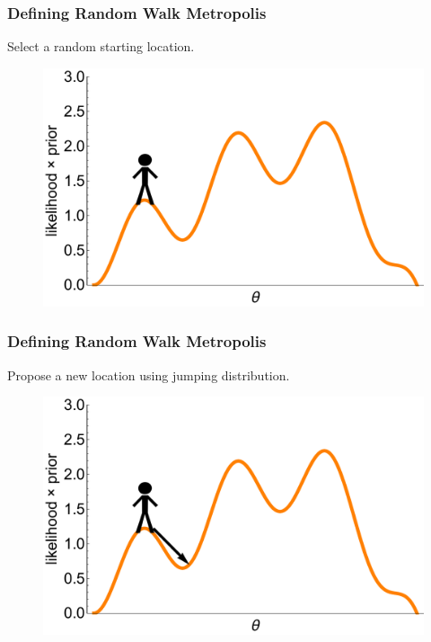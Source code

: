 \documentclass[handout]{beamer}
\begin{document}
\begin{frame}
\frametitle{Defining Random Walk Metropolis}
Select a random starting location.

\begin{figure}[ht]
\centerline{\includegraphics[width=1\textwidth]{animations_figures/lec4_metropolisDefinition2.pdf}}
\end{figure}

\end{frame}

\begin{frame}
\frametitle{Defining Random Walk Metropolis}
Propose a new location using jumping distribution.

\begin{figure}[ht]
\centerline{\includegraphics[width=1\textwidth]{animations_figures/lec4_metropolisDefinition3.pdf}}
\end{figure}

\end{frame}
\end{document}
